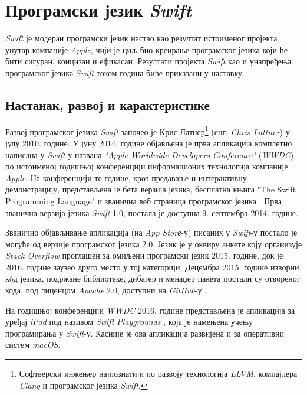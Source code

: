 \documentclass[12pt,oneside]{memoir}
\begin{document}
\chapter{Програмски језик \textit{Swift}}

\indent \textit{Swift} је модеран програмски језик настао као резултат истоименог пројекта унутар компаније \textit{Apple}, чији је циљ био креирање програмског језика  који ће бити сигуран, концизан и ефикасан. Резултати пројекта \textit{Swift} као и унапређења програмског језика \textit{Swift} током година биће приказани у наставку. 

\section{Настанак, развој и карактеристике}

\indent Развој програмског језика \textit{Swift} започео је Крис Латнер\footnote{Софтверски инжењер најпознатији по развоју технологија \textit{LLVM}, компајлера \textit{Clang} и програмског језика \textit{Swift}.} (енг. \textit{Chris Lattner}) у јулу 2010. године. У јуну 2014. године објављена је прва апликација комплетно написана у \textit{Swift}-у названа \textit{"Apple Worldwide Developers Conference"} (\textit{WWDC}) по истоименој годишњој конференцији информационих технологија компаније \textit{Apple}. На конференцији те године, кроз предавање и интерактивну демонстрацију, представљена је бета верзија језика, бесплатна књига "The Swift Programming Language" \cite{The_Swift_Programming_Language} и званична веб страница програмског језика \cite{SwiftOfficialSite}. Прва званична верзија језика \textit{Swift} 1.0, постала је доступна 9. септембра 2014. године.

\indent Званично објављивање апликација (на \textit{App Storе}-у) писаних у \textit{Swift}-у постало је могуће од верзије програмског језика 2.0. Језик је у оквиру анкете коју организује  \textit{Stack Overflow}  \cite{StackOverflow} проглашен за омиљени програмски језик 2015. године, док је 2016. године заузео друго место у тој категорији. Децембра 2015. године изворни к\^{o}д језика, подржане библиотеке, дибагер и менаџер пакета постали су отвореног кода, под лиценцом \textit{Apache} 2.0, доступни на \textit{GitHub}-у \cite{GitHub_Swift}.

\indent На годишњој конференцији \textit{WWDC} 2016. године представљена је апликација за уређај \textit{iPad} под називом \textit{Swift Playgrounds} \cite{Swift_Playground}, која је намењена учењу програмирања у \textit{Swift}-у. Касније је ова апликација развијена и за оперативни систем \textit{macOS}.
\end{document}
